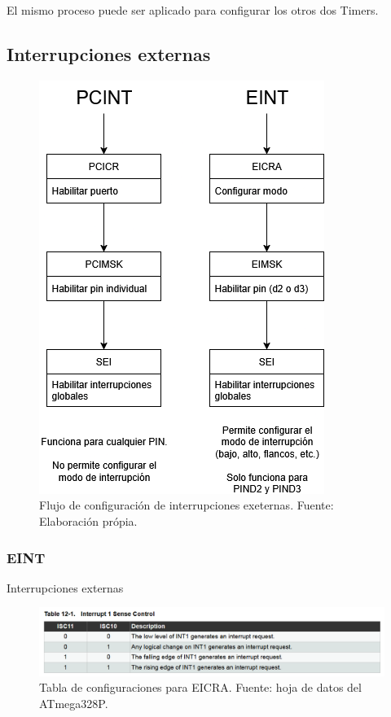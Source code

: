 El mismo proceso puede ser aplicado para configurar los otros dos Timers.

\subsection{Interrupciones externas}

   \begin{figure}[H]
    \centering
    \includegraphics[width=0.7\linewidth]{./Anexos/Marco Teorico/External Interrupts/Interrupt diagram.png}
    \caption{Flujo de configuración de interrupciones exeternas. Fuente: Elaboración própia.}
    \label{fig:InterruptDiagram}
    \end{figure}


    \subsubsection{EINT}
    Interrupciones externas 

    \begin{figure}[H]
    \centering
    \includegraphics[width=\linewidth]{./Anexos/Marco Teorico/External Interrupts/EICRA table.png}
    \caption{Tabla de configuraciones para EICRA. Fuente: hoja de datos del ATmega328P\@\cite{atmega328p_datasheet}.}
    \label{fig:EICRA-table}
    \end{figure}

